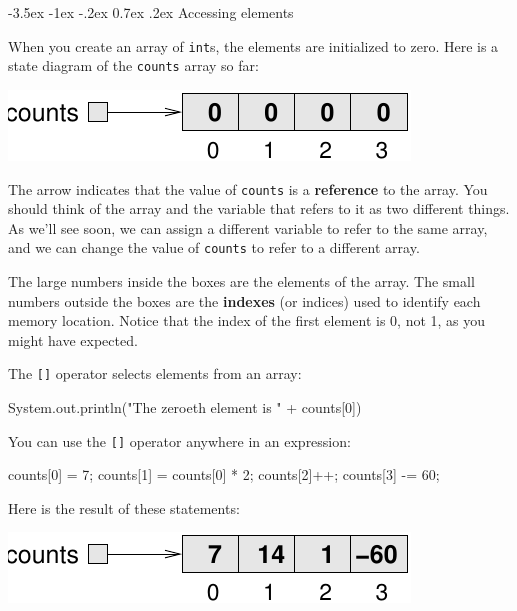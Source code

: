 \documentclass[12pt]{book}
\makeatletter
\theoremstyle{exercise}
\newcommand{\java}[1]{\verb"#1"}
\renewcommand{\section}{\@startsection{section}{1}{\z@}%
    {-3.5ex \@plus -1ex \@minus -.2ex}%
    {0.7ex \@plus.2ex}%
    {\normalfont\Large\bfseries}}
\newcommand{\java}[1]{\lstinline{#1}} %
\makeatother
\begin{document}
\section{Accessing elements}


When you create an array of \java{int}s, the elements are initialized to zero.
Here is a state diagram of the \java{counts} array so far:

\begin{center}
\includegraphics{figs/array.pdf}
\end{center}

The arrow indicates that the value of \java{counts} is a {\bf reference} to the array.
You should think of the array and the variable that refers to it as two different things.
As we'll see soon, we can assign a different variable to refer to the same array, and we can change the value of \java{counts} to refer to a different array.


The large numbers inside the boxes are the elements of the array.
The small numbers outside the boxes are the {\bf indexes} (or indices) used to identify each memory location.
Notice that the index of the first element is 0, not 1, as you might have expected.

The \java{[]} operator selects elements from an array:

\begin{code}
    System.out.println("The zeroeth element is " + counts[0])
\end{code}

You can use the \java{[]} operator anywhere in an expression:

\begin{code}
    counts[0] = 7;
    counts[1] = counts[0] * 2;
    counts[2]++;
    counts[3] -= 60;
\end{code}

Here is the result of these statements:

\begin{center}
\includegraphics{figs/array2.pdf}
\end{center}
\end{document}
